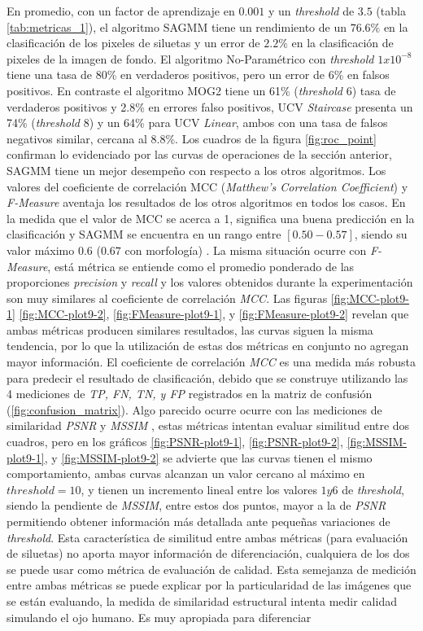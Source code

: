 En promedio, con un factor de aprendizaje en $0.001$ y un \textit{threshold} de $3.5$ (tabla \ref{tab:metricas_1}), el algoritmo SAGMM tiene un rendimiento de un $76.6\%$ en la clasificación de los pixeles de siluetas y un error de $2.2\%$ en la clasificación de pixeles de la imagen de fondo. El algoritmo No-Paramétrico con \textit{threshold} $1x10^{-8}$ tiene una tasa de 80\% en verdaderos positivos, pero un error de 6\% en falsos positivos. En contraste el algoritmo MOG2 tiene un 61\% (\textit{threshold} $6$) tasa de verdaderos positivos y 2.8\% en errores falso positivos,  UCV \textit{Staircase} presenta un 74\% (\textit{threshold} $8$) y un 64\% para UCV \textit{Linear}, ambos con una tasa de falsos negativos similar, cercana al 8.8\%. Los cuadros de la figura \ref{fig:roc_point} confirman lo evidenciado por las curvas de operaciones de la sección anterior, SAGMM tiene un mejor desempeño con respecto a los otros algoritmos. Los valores del coeficiente de correlación MCC (\textit{Matthew’s Correlation Coefficient}) y \textit{F-Measure} aventaja los resultados de los otros algoritmos en todos los casos. En la medida que el valor de MCC se acerca a 1, significa una buena predicción en la clasificación y SAGMM se encuentra en un rango entre $[0.50-0.57]$, siendo su valor máximo $0.6$ ($0.67$ con morfología) . La misma situación ocurre con \textit{F-Measure}, está métrica se entiende como el promedio ponderado de las proporciones \textit{precision} y \textit{recall} y los valores obtenidos durante la experimentación son muy similares al coeficiente de correlación \textit{MCC}. Las figuras \ref{fig:MCC-plot9-1} \ref{fig:MCC-plot9-2}, \ref{fig:FMeasure-plot9-1}, y \ref{fig:FMeasure-plot9-2} revelan que ambas métricas producen similares resultados, las curvas siguen la misma tendencia, por lo que la utilización de estas dos métricas en conjunto no agregan mayor información. El coeficiente de correlación \textit{MCC} es una medida más robusta para predecir el resultado de clasificación, debido que se construye utilizando las 4 mediciones de \textit{TP, FN, TN, y FP} registrados en la matriz de confusión (\ref{fig:confusion_matrix}).  Algo parecido ocurre ocurre con las mediciones de similaridad \textit{PSNR} \cite{signal_zhou_2009} y \textit{MSSIM} \cite{wang_image_2004}, estas métricas intentan evaluar similitud entre dos cuadros, pero en los gráficos \ref{fig:PSNR-plot9-1}, \ref{fig:PSNR-plot9-2}, \ref{fig:MSSIM-plot9-1}, y \ref{fig:MSSIM-plot9-2} se advierte que las curvas tienen el mismo comportamiento, ambas curvas alcanzan un valor cercano al máximo en $threshold=10$, y tienen un incremento lineal entre los valores $1 y 6$ de \textit{threshold}, siendo la pendiente de \textit{MSSIM}, entre estos dos puntos, mayor a la de \textit{PSNR} permitiendo obtener información más detallada ante pequeñas variaciones de \textit{threshold}. Esta característica de similitud entre ambas métricas (para evaluación de siluetas) no aporta mayor información de diferenciación, cualquiera de los dos se puede usar como métrica de evaluación de calidad. Esta semejanza de medición entre ambas métricas se puede explicar por la particularidad de las imágenes que se están evaluando, la medida de similaridad estructural intenta medir calidad simulando el ojo humano. Es muy apropiada para diferenciar 